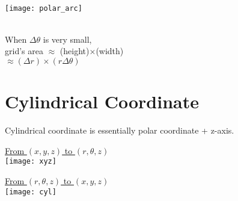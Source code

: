 \documentclass[class=article, crop=false, 12pt]{standalone}
\begin{document}
\begin{itemize}
    \hfill\\[1em]
    \begin{center}
        \begin{minipage}{0.3\textwidth}
            \centering
            \texttt{[image: polar\_arc]}
        \end{minipage}
        \begin{minipage}{0.4\textwidth}
            \centering
            \\[1em]
            When $\Delta \theta$ is very small,\\
            grid's area $\approx$ (height)$\times$(width)\\
            \hspace{7.5ex}$\approx (\Delta r) \times (r\Delta \theta)$
        \end{minipage}
    \end{center}

\end{itemize}


\linesep
\section{Cylindrical Coordinate}

Cylindrical coordinate is essentially polar coordinate + z-axis.

\begin{center}
    \begin{minipage}{0.4\textwidth}
        \centering
        \ul{From $(x,y,z)$ to $(r,\theta,z)$}
        \\[1em]
        \texttt{[image: xyz]}
        \\[-2em]
    \end{minipage}
    \begin{minipage}{0.4\textwidth}
        \centering
        \ul{From $(r,\theta,z)$ to $(x,y,z)$}
        \\[1em]
        \texttt{[image: cyl]}
        \\[-2em]
    \end{minipage}
\end{center}
\end{document}
